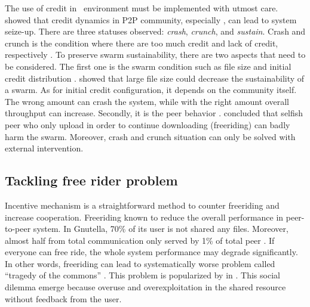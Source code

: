 The use of credit in \bt~environment must be implemented with utmost care. \citeauthor{2010:crashsustain:rahman} showed that credit dynamics in P2P community, especially \bt, can lead to system seize-up. There are three statuses observed: \textit{crash}, \textit{crunch}, and \textit{sustain}. Crash and crunch is the condition where there are too much credit and lack of credit, respectively \cite{2010:crashsustain:rahman, 2015:sustainabilitypt:vinko}. To preserve swarm sustainability, there are two aspects that need to be considered. The first one is the swarm condition such as file size and initial credit distribution \cite{2015:sustainabilitypt:vinko}. \citeauthor{2015:sustainabilitypt:vinko} showed that large file size could decrease the sustainability of a swarm. As for initial credit configuration, it depends on the community itself. The wrong amount can crash the system, while with the right amount overall throughput can increase. Secondly, it is the peer behavior \cite{2010:crashsustain:rahman}. \citeauthor{2010:crashsustain:rahman} concluded that selfish peer who only upload in order to continue downloading (freeriding) can badly harm the swarm. Moreover, crash and crunch situation can only be solved with external intervention.

\subsection{Tackling free rider problem}
Incentive mechanism is a straightforward method to counter freeriding and increase cooperation. Freeriding known to reduce the overall performance in peer-to-peer system. In Gnutella, 70\% of its user is not shared any files. Moreover, almost half from total communication only served by 1\% of total peer \cite{2000:freeridegnutella:adar}. If everyone can free ride, the whole system performance may degrade significantly. In other words, freeriding can lead to systematically worse problem called ``tragedy of the commons'' \cite{1968:tragedycommon:hardin}. This problem is popularized by \citet*{1968:tragedycommon:hardin} in \citeyear{1968:tragedycommon:hardin}. This social dilemma emerge because overuse and overexploitation in the shared resource without feedback from the user.


